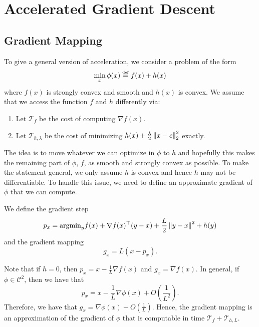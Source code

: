\section{Accelerated Gradient Descent\label{sec:Accelerated-Gradient-Descent}}


\subsection{Gradient Mapping}

To give a general version of acceleration, we consider a problem of
the form
\[
\min_{x}\phi(x)\stackrel{\mathrm{{\scriptscriptstyle def}}}{=} f(x)+h(x)
\]
where $f(x)$ is strongly convex and smooth and $h(x)$ is convex.
We assume that we access the function $f$ and $h$ differently via:
\begin{enumerate}
\item Let $\mathcal{T}_{f}$ be the cost of computing $\nabla f(x)$.
\item Let $\mathcal{T}_{h,\lambda}$ be the cost of minimizing $h(x)+\frac{\lambda}{2}\left\Vert x-c\right\Vert^{2}_{2}$
exactly.
\end{enumerate}
The idea is to move whatever we can optimize in $\phi$ to $h$ and
hopefully this makes the remaining part of $\phi$, $f$, as smooth
and strongly convex as possible. To make the statement general, we
only assume $h$ is convex and hence $h$ may not be differentiable.
To handle this issue, we need to define an approximate gradient of
$\phi$ that we can compute.
\begin{defn}
We define the gradient step
\[
p_{x}=\mathrm{argmin}_{y}f(x)+\nabla f(x)^{\top}(y-x)+\frac{L}{2}\left\Vert y-x\right\Vert^{2}+h(y)
\]
and the gradient mapping
\[
g_{x}=L(x-p_{x}).
\]
\end{defn}

Note that if $h=0$, then $p_{x}=x-\frac{1}{L}\nabla f(x)$ and $g_{x}=\nabla f(x)$.
In general, if $\phi\in\mathcal{C}^{2}$, then we have that
\[
p_{x}=x-\frac{1}{L}\nabla\phi(x)+O(\frac{1}{L^{2}}).
\]
Therefore, we have that $g_{x}=\nabla\phi(x)+O(\frac{1}{L})$. Hence,
the gradient mapping is an approximation of the gradient of $\phi$
that is computable in time $\mathcal{T}_{f}+\mathcal{T}_{h,L}$.

